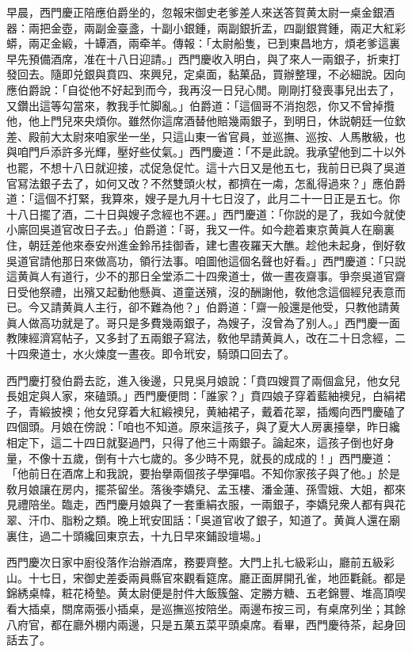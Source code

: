 早晨，西門慶正陪應伯爵坐的，忽報宋御史老爹差人來送答賀黄太尉一桌金銀酒器：兩把金壺，兩副金臺盞，十副小銀鍾，兩副銀折盂，四副銀賞鍾，兩疋大紅彩蟒，兩疋金緞，十罈酒，兩牵羊。傳報：「太尉船隻，已到東昌地方，煩老爹這裏早先預備酒席，准在十八日迎請。」西門慶收入明白，與了來人一兩銀子，折柬打發回去。隨即兑銀與賁四、來興兒，定桌面，黏菓品，買辦整理，不必細說。因向應伯爵說：「自從他不好起到而今，我再沒一日兒心閒。剛剛打發喪事兒出去了，又鑽出這等勾當來，教我手忙脚亂。」伯爵道：「這個哥不消抱怨，你又不曾掉攬他，他上門兒來央煩你。雖然你這席酒替他賠幾兩銀子，到明日，休説朝廷一位欽差、殿前大太尉來咱家坐一坐，只這山東一省官員，並巡撫、巡按、人馬散級，也與咱門戶添許多光輝，壓好些仗氣。」西門慶道：「不是此說。我承望他到二十以外也罷，不想十八日就迎接，忒促急促忙。這十六日又是他五七，我前日已與了吳道官冩法銀子去了，如何又改？不然雙頭火杖，都擠在一䖏，怎亂得過來？」應伯爵道：「這個不打緊，我算來，嫂子是九月十七日沒了，此月二十一日正是五七。你十八日擺了酒，二十日與嫂子念經也不遲。」西門慶道：「你説的是了，我如今就使小廝回吳道官改日子去。」伯爵道：「哥，我又一件。如今趂着東京黄眞人在廟裏住，朝廷差他來泰安州進金鈴吊挂御香，建七晝夜羅天大醮。趁他未起身，倒好敎吳道官請他那日來做高功，領行法事。咱圖他這個名聲也好看。」西門慶道：「只説這黄眞人有道行，少不的那日全堂添二十四衆道士，做一晝夜齋事。爭奈吳道官齋日受他祭禮，出殯又起動他懸眞、道童送殯，沒的酬謝他，敎他念這個經兒表意而已。今又請黄眞人主行，卻不難為他？」伯爵道：「齋一般還是他受，只教他請黄眞人做高功就是了。哥只是多費幾兩銀子，為嫂子，沒曾為了别人。」西門慶一面教陳經濟寫帖子，又多封了五兩銀子寫法，敎他早請黄眞人，改在二十日念經，二十四衆道士，水火煉度一晝夜。即令玳安，騎頭口回去了。

西門慶打發伯爵去訖，進入後邊，只見吳月娘說：「賁四嫂買了兩個盒兒，他女兒長姐定與人家，來磕頭。」西門慶便問：「誰家？」賁四娘子穿着藍紬襖兒，白絹裙子，青緞披襖；他女兒穿着大紅緞襖兒，黄紬裙子，戴着花翠，插燭向西門慶磕了四個頭。月娘在傍說：「咱也不知道。原來這孩子，與了夏大人房裏擡擧，昨日纔相定下，這二十四日就娶過門，只得了他三十兩銀子。論起來，這孩子倒也好身量，不像十五歲，倒有十六七歲的。多少時不見，就長的成成的！」西門慶道：「他前日在酒席上和我說，要抬擧兩個孩子學彈唱。不知你家孩子與了他。」於是敎月娘讓在房内，擺茶留坐。落後李嬌兒、孟玉樓、潘金蓮、孫雪娥、大姐，都來見禮陪坐。臨走，西門慶月娘與了一套重絹衣服，一兩銀子，李嬌兒衆人都有與花翠、汗巾、脂粉之類。晚上玳安囬話：「吳道官收了銀子，知道了。黄眞人還在廟裏住，過二十頭纔回東京去，十九日早來鋪設壇場。」

西門慶次日家中廚役落作治辦酒席，務要齊整。大門上扎七級彩山，廳前五級彩山。十七日，宋御史差委兩員縣官來觀看筵席。廳正面屏開孔雀，地匝氍毹。都是錦綉桌幃，粧花椅墊。黄太尉便是肘件大飯簇盤、定勝方糖、五老錦豐、堆高頂喫看大插桌，關席兩張小插桌，是巡撫巡按陪坐。兩邊布按三司，有桌席列坐；其餘八府官，都在廳外棚内兩邊，只是五菓五菜平頭桌席。看畢，西門慶待茶，起身回話去了。

